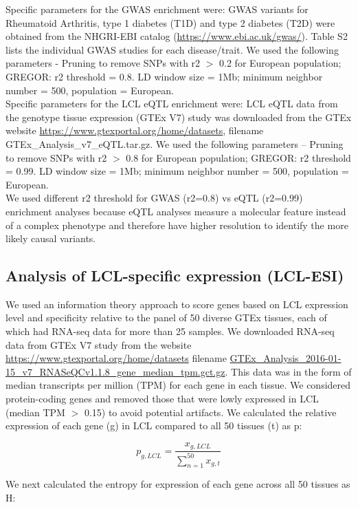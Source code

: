 Specific parameters for the GWAS enrichment were: GWAS variants for Rheumatoid Arthritis, type 1 diabetes (T1D) and type 2 diabetes (T2D) were obtained from the NHGRI-EBI catalog (\url{https://www.ebi.ac.uk/gwas/}). Table S2 lists the individual GWAS studies for each disease/trait. We used the following parameters - Pruning to remove SNPs with r2 $>$ 0.2 for European population; GREGOR: r2 threshold = 0.8. LD window size = 1Mb; minimum neighbor number = 500, population = European.\\

Specific parameters for the LCL eQTL enrichment were: LCL eQTL data from the genotype tissue expression (GTEx V7) study was downloaded from the GTEx website \url{https://www.gtexportal.org/home/datasets}, filename GTEx\_Analysis\_v7\_eQTL.tar.gz. We used the following parameters – Pruning to remove SNPs with r2 $>$ 0.8 for European population; GREGOR: r2 threshold = 0.99. LD window size = 1Mb; minimum neighbor number = 500, population = European. \\

We used different r2 threshold for GWAS (r2=0.8) vs eQTL (r2=0.99) enrichment analyses because eQTL analyses measure a molecular feature instead of a complex phenotype and therefore have higher resolution to identify the more likely causal variants.

\subsection{Analysis of LCL-specific expression (LCL-ESI)}
We used an information theory approach \cite{schugPromoterFeaturesRelated2005, heGlobalViewEnhancer2014} to score genes based on LCL expression level and specificity relative to the panel of 50 diverse GTEx tissues, each of which had RNA-seq data for more than 25 samples. We downloaded RNA-seq data from GTEx V7 study from the website \url{https://www.gtexportal.org/home/datasets} filename \url{GTEx\_Analysis\_2016-01-15\_v7\_RNASeQCv1.1.8\_gene\_median\_tpm.gct.gz}. This data was in the form of median transcripts per million (TPM) for each gene in each tissue. We considered protein-coding genes and removed those that were lowly expressed in LCL (median TPM $>$ 0.15) to avoid potential artifacts. We calculated the relative expression of each gene (g) in LCL compared to all 50 tissues (t) as p:

\[ p_{g,LCL} = \frac{x_{g, LCL}}{\sum_{n=1}^{50}x_{g,t}}  \]

We next calculated the entropy for expression of each gene across all 50 tissues as H:

